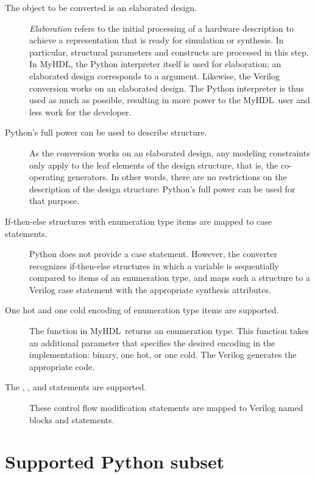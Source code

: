 \documentclass{howto}
\newcommand{\myhdl}{\protect \mbox{MyHDL}}
\begin{document}
\begin{description}
\item[The object to be converted is an elaborated design.]
\emph{Elaboration} refers to the initial processing of
a hardware description to achieve a representation that
is ready for simulation or synthesis. In particular, structural
parameters and constructs are processed in this step. In
\myhdl{}, the Python interpreter itself is used for elaboration;
an elaborated design corresponds to a 
argument. Likewise, the Verilog conversion works on an
elaborated design. The Python interpreter is thus used
as much as possible, resulting in more power to the 
\myhdl\ user and less work for the developer.

\item[Python's full power can be used to describe structure.]
As the conversion works on an elaborated design, any modeling
constraints only apply to the leaf elements of the design
structure, that is, the co-operating generators. In other words, there
are no restrictions on the description of the design structure:
Python's full power can be used for that purpose.

\item[If-then-else structures with enumeration type items are mapped to case statements.]
Python does not provide a case statement. However, 
the converter recognizes if-then-else structures in which a variable is
sequentially compared to items of an enumeration type, and maps
such a structure to a Verilog case statement with the appropriate
synthesis attributes.

\item[One hot and one cold encoding of enumeration type items are supported.]
The  function in \myhdl\ returns an enumeration type. This
function takes an additional parameter  that specifies the
desired encoding in the implementation: binary, one hot, or one cold.
The Verilog  generates the appropriate code.

\item[The , , and  statements are supported.]
These control flow modification statements are mapped to Verilog named blocks
and  statements.

\end{description}


\section{Supported Python subset}
\end{document}
